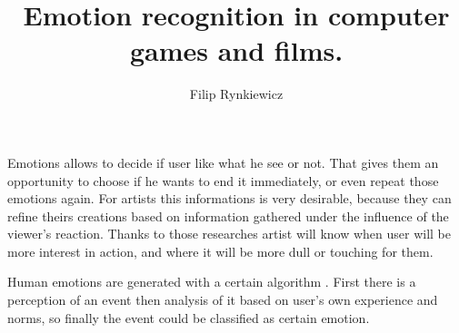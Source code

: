 \documentclass[10pt,journal,compsoc,twoside]{IEEEtran}
\begin{document}
\title{Emotion recognition in computer games and films.}

\author{Filip Rynkiewicz%
}


%
{}


\maketitle
\IEEEdisplaynontitleabstractindextext
\IEEEpeerreviewmaketitle
{}
Emotions allows to decide if user like what he see or not. That gives them an opportunity to choose if he wants to end it immediately, or even repeat those emotions again. For artists this informations is very desirable, because they can refine theirs creations based on information gathered under the influence of the viewer's reaction. Thanks to those researches artist will know when user will be more interest in action, and where it will be more dull or touching for them. 

Human emotions are generated with a certain algorithm \cite{OrtonyCloreCollins1988}. First there is a perception of an event then analysis of it based on user's own experience and norms, so finally the event could be classified as certain emotion.
\end{document}
